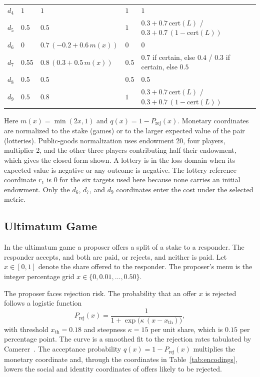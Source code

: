\documentclass[journal]{IEEEtran}
\begin{document}
\begin{table}[!t]
\begin{tabular}{@{}c l l l l l l@{}}
$d_4$ & $1$ & $1$ & $1$ & \multicolumn{3}{l}{$1$} \\
$d_5$ & $0.5$ & $0.5$ & $1$ & \multicolumn{3}{l}{$0.3+0.7\,\mathrm{cert}(L)$ / $0.3+0.7\,(1-\mathrm{cert}(L))$} \\
$d_6$ & $0$ & $0.7\,(-0.2+0.6\,m(x))$ & $0$ & \multicolumn{3}{l}{$0$} \\
$d_7$ & $0.55$ & $0.8\,(0.3+0.5\,m(x))$ & $0.5$ & \multicolumn{3}{l}{$0.7$ if certain, else $0.4$ / $0.3$ if certain, else $0.5$} \\
$d_8$ & $0.5$ & $0.5$ & $0.5$ & \multicolumn{3}{l}{$0.5$} \\
$d_9$ & $0.5$ & $0.8$ & $1$ & \multicolumn{3}{l}{$0.3+0.7\,\mathrm{cert}(L)$ / $0.3+0.7\,(1-\mathrm{cert}(L))$} \\
\bottomrule
\end{tabular}
\begin{flushleft}
\footnotesize{Here $m(x)=\min(2x,1)$ and $q(x)=1-P_{\text{rej}}(x)$. Monetary coordinates are normalized to the stake (games) or to the larger expected value of the pair (lotteries). Public-goods normalization uses endowment 20, four players, multiplier 2, and the other three players contributing half their endowment, which gives the closed form shown. A lottery is in the loss domain when its expected value is negative or any outcome is negative. The lottery reference coordinate $r_1$ is $0$ for the six targets used here because none carries an initial endowment. Only the $d_6$, $d_7$, and $d_9$ coordinates enter the cost under the selected metric.}
\end{flushleft}
\end{table}

\subsection{Ultimatum Game}

In the ultimatum game a proposer offers a split of a stake to a responder.
The responder accepts, and both are paid, or rejects, and neither is paid.
Let $x \in [0,1]$ denote the share offered to the responder.
The proposer's menu is the integer percentage grid $x\in\{0,0.01,\dots,0.50\}$.

The proposer faces rejection risk.
The probability that an offer $x$ is rejected follows a logistic function
\begin{equation}
    P_{\text{rej}}(x) = \frac{1}{1 + \exp\!\bigl(\kappa\,(x - x_{\text{th}})\bigr)},
    \label{eq:rejection}
\end{equation}
with threshold $x_{\text{th}} = 0.18$ and steepness $\kappa = 15$ per unit share, which is $0.15$ per percentage point.
The curve is a smoothed fit to the rejection rates tabulated by Camerer~\cite{camerer2003}.
The acceptance probability $q(x)=1-P_{\text{rej}}(x)$ multiplies the monetary coordinate and, through the coordinates in Table~\ref{tab:encodings}, lowers the social and identity coordinates of offers likely to be rejected.
\end{document}
